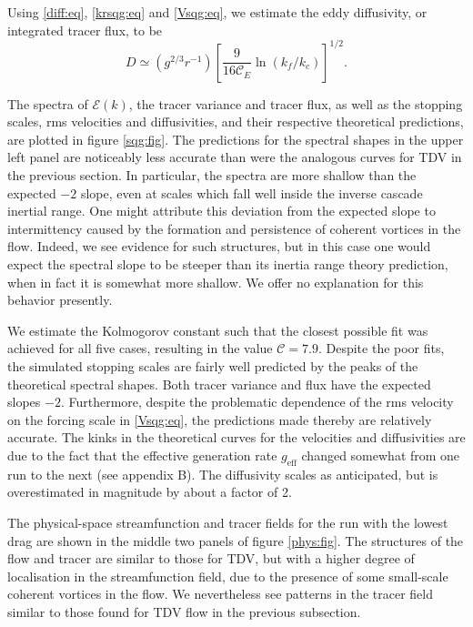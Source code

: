 \documentclass{jfm}
\newcommand{\ca}  [1]{\mathcal{#1}}
\begin{document}
Using \eqref{diff:eq}, \eqref{krsqg:eq} and \eqref{Vsqg:eq}, we
estimate the eddy diffusivity, or integrated tracer flux, to be
\begin{equation}
D \simeq
\left(g^{2/3}r^{-1}\right)
\left[\frac{9}{16\ca{C}_E}\ln\left(k_f/k_c\right)\right]^{1/2}.
\label{diffsqg:eq}
\end{equation}

The spectra of $\ca{E}(k)$, the tracer variance and tracer flux, as
well as the stopping scales, rms velocities and diffusivities, and
their respective theoretical predictions, are plotted in figure
\ref{sqg:fig}.  The predictions for the spectral shapes in the upper
left panel are noticeably less accurate than were the analogous curves
for TDV in the previous section.  In particular, the spectra are more
shallow than the expected $-2$ slope, even at scales which fall well
inside the inverse cascade inertial range.  One might attribute this
deviation from the expected slope to intermittency caused by the
formation and persistence of coherent vortices in the flow.  Indeed,
we see evidence for such structures, but in this case one would expect
the spectral slope to be steeper than its inertia range theory
prediction, when in fact it is somewhat more shallow.  We offer no
explanation for this behavior presently.

We estimate the Kolmogorov constant such that the closest possible fit
was achieved for all five cases, resulting in the value $\ca{C} =
7.9$.  Despite the poor fits, the simulated stopping scales are fairly
well predicted by the peaks of the theoretical spectral shapes.  Both
tracer variance and flux have the expected slopes $-2$.  Furthermore,
despite the problematic dependence of the rms velocity on the forcing
scale in \eqref{Vsqg:eq}, the predictions made thereby are relatively
accurate.  The kinks in the theoretical curves for the velocities and
diffusivities are due to the fact that the effective generation rate
$g_{\mathrm{eff}}$ changed somewhat from one run to the next (see
appendix B).  The diffusivity scales as anticipated, but is
overestimated in magnitude by about a factor of 2.

The physical-space streamfunction and tracer fields for the run with
the lowest drag are shown in the middle two panels of figure
\ref{phys:fig}.  The structures of the flow and tracer are similar to
those for TDV, but with a higher degree of localisation in the
streamfunction field, due to the presence of some small-scale coherent
vortices in the flow.  We nevertheless see patterns in the tracer
field similar to those found for TDV flow in the previous subsection.
\end{document}
